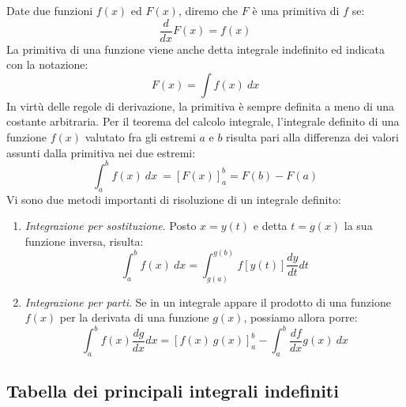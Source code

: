 \documentclass[10pt,a4paper]{book}
\begin{document}
Date due funzioni $\displaystyle f( x)$ ed $\displaystyle F( x)$, diremo che $\displaystyle F$ è una primitiva di $\displaystyle f$ se:
\begin{equation*}
	\frac{d}{dx} F(x) =f(x)
\end{equation*}
La primitiva di una funzione viene anche detta integrale indefinito ed indicata con la notazione:
\begin{equation*}
	F(x) =\int f(x) \ dx
\end{equation*}
In virtù delle regole di derivazione, la primitiva è sempre definita a meno di una costante arbitraria. Per il teorema del calcolo integrale, l'integrale definito di una funzione $\displaystyle f( x)$ valutato fra gli estremi $\displaystyle a$ e $\displaystyle b$ risulta pari alla differenza dei valori assunti dalla primitiva nei due estremi:
\begin{equation*}
	\int^b_a f( x) \ dx\ =[ F( x)]^b_a =F( b) -F( a)
\end{equation*}
Vi sono due metodi importanti di risoluzione di un integrale definito:
\begin{enumerate}
	\item \textit{Integrazione per sostituzione}. Posto $\displaystyle x=y( t)$ e detta $\displaystyle t=g( x)$ la sua funzione inversa, risulta:
	\[
		\int^b_a f( x) \ dx=\int^{g( b)}_{g( a)} f[ y( t)]\frac{dy}{dt} dt
	\]
	\item \textit{Integrazione per parti}. Se in un integrale appare il prodotto di una funzione $\displaystyle f( x)$ per la derivata di una funzione $\displaystyle g( x)$, possiamo allora porre:
	\[
		\int^b_a f( x)\frac{dg}{dx} dx=[ f( x) \ g( x)]^b_a -\int^b_a\frac{df}{dx} g( x) \ dx
	\]
\end{enumerate}



\subsection*{Tabella dei principali integrali indefiniti}
\end{document}
